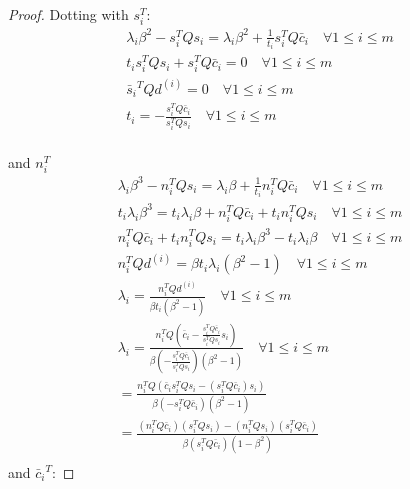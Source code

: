 \begin{proof}
Dotting with $s_i^T$:
\begin{align*}
\lambda_i\beta^2 - s_i^T Q s_i = \lambda_i\beta^2 + \frac 1 { t_i}s_i^T Q \bar c_i \quad \forall 1\le i\le m \\
t_i s_i^T Q s_i + s_i^T Q \bar c_i = 0 \quad \forall 1\le i\le m \\
{\bar s_i}^T Q d^{(i)} = 0 \quad \forall 1\le i\le m \\
t_i =- \frac{s_i^T Q \bar c_i}{s_i^T Q s_i} \quad \forall 1\le i\le m \\
\end{align*}

and $n_i^T$
\begin{align*}
\lambda_i\beta^3 - n_i^TQ s_i = \lambda_i\beta + \frac 1 { t_i} n_i^T Q \bar c_i \quad \forall 1\le i\le m \\
t_i\lambda_i\beta^3 = t_i\lambda_i\beta + n_i^T Q \bar c_i + t_in_i^TQ s_i\quad \forall 1\le i\le m \\
n_i^T Q \bar c_i + t_in_i^TQ s_i = t_i\lambda_i\beta^3 - t_i\lambda_i\beta \quad \forall 1\le i\le m \\
n_i^T Q d^{(i)} = \beta t_i\lambda_i(\beta^2 - 1) \quad \forall 1\le i\le m \\
\lambda_i = \frac{n_i^T Q d^{(i)}}{\beta t_i(\beta^2 - 1)} \quad \forall 1\le i\le m \\
\lambda_i = \frac{n_i^T Q \left(\bar c_i - \frac{s_i^T Q \bar c_i}{s_i^T Q s_i} s_i\right)}{\beta \left(- \frac{s_i^T Q \bar c_i}{s_i^T Q s_i}\right)(\beta^2 - 1)} \quad \forall 1\le i\le m \\
= \frac{n_i^T Q \left(\bar c_i s_i^T Q s_i - ({s_i^T Q \bar c_i}) s_i\right)}{\beta \left(-{s_i^T Q \bar c_i}\right)(\beta^2 - 1)} \\
= \frac{(n_i^T Q \bar c_i)(s_i^T Q s_i) - (n_i^T Q s_i) ({s_i^T Q \bar c_i})}{\beta \left({s_i^T Q \bar c_i}\right)(1 - \beta^2)} \\
\end{align*}
and ${\bar c_i}^T$:


\end{proof}
